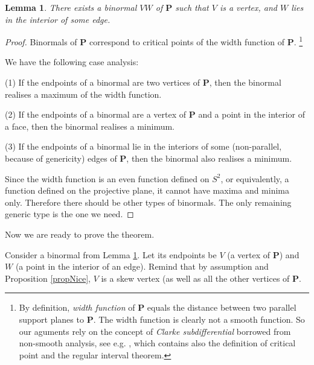 \documentclass[12pt]{amsart}
\newtheorem{lemma}{Lemma}
\newtheorem*{main lemma}{The main lemma}
\begin{document}
\begin{lemma}\label{binormal}
There exists a binormal $VW$ of $\mathbf{P}$ such that $V$ is a vertex, and $W$ lies in the interior of some edge.
\end{lemma}
\begin{proof}

    Binormals of $\mathbf{P}$ correspond to critical points of the width function of $\mathbf{P}$. \footnote{By definition, \textit{width function} of $\mathbf{P}$ equals the distance between two parallel support planes to $\mathbf{P}$. The width function is clearly not a smooth function.
    So our aguments rely on the concept of \textit{Clarke subdifferential} borrowed from non-smooth analysis, see e.g.
 \cite{Agr}, which contains also the definition of critical point and the regular
interval theorem. %
 }

    We have the following case analysis:
    
  (1) If the  endpoints of a binormal are two vertices of $\mathbf{P}$, then the binormal realises a  maximum of the width function.
  
  
  
  (2) If the  endpoints of a binormal are a vertex of $\mathbf{P}$ and a point in the interior of a face, then the binormal realises a minimum.
  
   
  (3) If the  endpoints of a binormal lie in the interiors of some (non-parallel, because of genericity) edges of $\mathbf{P}$, then the binormal also realises a  minimum.
  
   
   
  Since the width function is an even function defined on $S^2$, or equivalently, a function defined on the projective plane, it cannot have maxima and minima only. Therefore  there should be other types of binormals. The only remaining generic type is the one we need.
\end{proof}



Now we are ready to prove the theorem. 

Consider a binormal from Lemma \ref{binormal}.  Let its endpoints be $V$ (a vertex of $\mathbf{P}$) and $W$  (a point in the interior of an edge).
Remind that by assumption and Proposition \ref{propNice},  $V$ is a skew vertex (as well as all the other vertices of $\mathbf{P}$.

\bigskip
\end{document}
